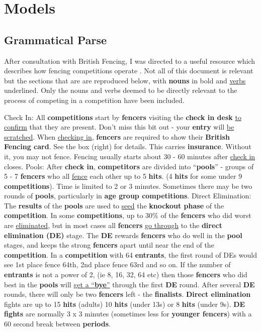 \chapter{Models}
\section{Grammatical Parse} \label{section:gramaticalParse}
After consultation with British Fencing, I was directed to a useful resource
which describes how fencing competitions operate \citep{bf-comp-guide}. Not
all of this document is relevant but the sections that are are reproduced
below, with \textbf{nouns} in bold and \underline{verbs} underlined. Only the
nouns and verbs deemed to be directly relevant to the process of competing in a
competition have been included.
\begin{displayquote}
Check In: All \textbf{competitions} start by \textbf{fencers}
visiting the \textbf{check in desk} \underline{to confirm} that they
are present. Don’t miss this bit out - your \textbf{entry}
will \underline{be scratched}.
When \underline{checking in}, \textbf{fencers} are required to show
their \textbf{British Fencing card}. See the box (right) for
details. This carries \textbf{insurance}. Without it, you
may not fence. Fencing usually starts about 30 - 60 minutes
after \underline{check in} closes.
Pools: After \textbf{check in}, \textbf{competitors} are divided
into “\textbf{pools}” - groups of 5 - 7 \textbf{fencers} who all
\underline{fence} each other up to 5 \textbf{hits}. (4 \textbf{hits} for some
under 9 \textbf{competitions}). Time is limited to 2 or 3
minutes. Sometimes there may be two rounds of
\textbf{pools}, particularly in \textbf{age group competitions}.
Direct Elimination: The \textbf{results} of the \textbf{pools}
are used to \underline{seed} the \textbf{knockout phase} of the
\textbf{competition}. In some \textbf{competitions}, up to 30\%
of the \textbf{fencers} who did worst are \underline{eliminated}, but
in most cases all \textbf{fencers} \underline{go through} to the \textbf{direct
elimination (DE)} stage.
The \textbf{DE} rewards \textbf{fencers} who do well in the
\textbf{pool} stages, and keeps the strong \textbf{fencers} apart
until near the end of the \textbf{competition}. In a
\textbf{competition} with 64 \textbf{entrants}, the first round of
DEs would see 1st place fence 64th, 2nd place
fence 63rd and so on. If the number of
\textbf{entrants} is not a power of 2, (ie 8, 16, 32, 64
etc) then those \textbf{fencers} who did best in the \textbf{pools}
will \underline{get a “\textbf{bye}”} through the first \textbf{DE} round. After
several \textbf{DE} rounds, there will only be two \textbf{fencers}
left - the \textbf{finalists}.
\textbf{Direct elimination} fights are up to 15 \textbf{hits} (adults)
10 \textbf{hits} (under 13s) or 8 \textbf{hits} (under 9s). \textbf{DE fights}
are normally 3 x 3 minutes (sometimes less for \textbf{younger
fencers}) with a 60 second break between \textbf{periods}.
\end{displayquote}
